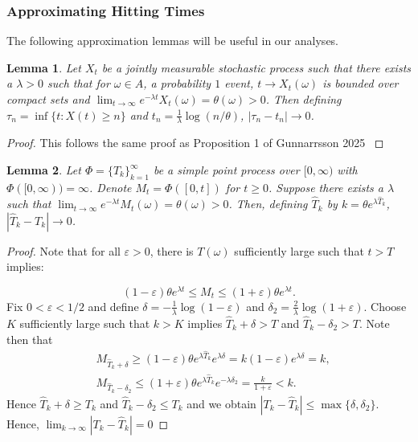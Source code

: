 \documentclass{article}
\numberwithin{equation}{section}
\newtheorem{lemma}{Lemma}
\begin{document}
\subsubsection{Approximating Hitting Times}

The following approximation lemmas will be useful in our analyses.

\begin{lemma}\label{lem:large_size_time}
  Let $X_t$ be a jointly measurable stochastic process such that there exists a $\lambda>0$ such that for $\omega\in A$, a probability $1$ event, $t\to X_t(\omega)$ is bounded over compact sets and $\lim_{t\to\infty}e^{-\lambda t}X_t(\omega)=\theta(\omega)>0$. Then defining $\tau_n=\inf\{t:X(t)\geq n\}$ and $t_n=\frac{1}{\lambda}\log(n/\theta)$, $|\tau_n-t_n|\to 0$.
\end{lemma}

\begin{proof}
  This follows the same proof as Proposition 1 of Gunnarrsson 2025 \cite{gunnarsson2025}
\end{proof}

\begin{lemma}\label{lem:point_process_times}
  Let $\Phi=\{T_k\}_{k=1}^\infty$ be a simple point process over $[0,\infty)$ with $\Phi([0,\infty))=\infty$. Denote $M_t=\Phi([0,t])$ for $t\geq 0$. Suppose there exists a $\lambda$ such that $\lim_{t\to\infty}e^{-\lambda t}M_t(\omega)=\theta(\omega)>0$. Then, defining $\widehat{T}_k$ by $k=\theta e^{\lambda \widehat{T}_k}$, $|\widehat{T}_k-T_k|\to 0$.
\end{lemma}

\begin{proof}
  Note that for all $\varepsilon>0$, there is $T(\omega)$ sufficiently large such that $t>T$ implies:

    \[(1-\varepsilon)\theta e^{\lambda t}\leq M_t\leq (1+\varepsilon)\theta e^{\lambda t}.\]
Fix $0<\varepsilon<1/2$ and define $\delta=-\frac{1}{\lambda}\log(1-\varepsilon)$ and $\delta_2=\frac{2}{\lambda}\log(1+\varepsilon)$. Choose $K$ sufficiently large such that $k>K$ implies $\widehat{T}_k+\delta>T$ and $\widehat{T}_k-\delta_2>T$. Note then that
\begin{align*}
    &M_{\widehat{T}_k+\delta}\geq(1-\varepsilon) \theta e^{\lambda \widehat{T}_k}e^{\lambda\delta}=k(1-\varepsilon)e^{\lambda \delta}= k,\\
    &M_{\widehat{T}_k-\delta_2}\leq (1+\varepsilon)\theta e^{\lambda \widehat{T}_k}e^{-\lambda \delta_2}=\frac{k}{1+\varepsilon}<k.
\end{align*}
Hence $\widehat{T}_k+\delta\geq T_k$ and $\widehat{T}_k-\delta_2\leq T_k$ and we obtain $|T_k-\widehat{T}_k|\leq \max\{\delta,\delta_2\}$. Hence, $\lim_{k\to\infty} |T_k-\widehat{T}_k|=0$
\end{proof}
\end{document}
